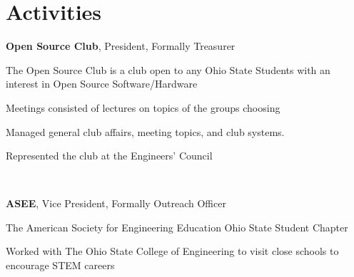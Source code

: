 \documentclass[letterpaper]{resume}
\begin{document}
\section{Activities}

\textbf{Open Source Club}, President, Formally Treasurer
\begin{compactitem}
	\item The Open Source Club is a club open to any Ohio State Students with an interest in Open Source Software/Hardware
	\item Meetings consisted of lectures on topics of the groups choosing
	\item Managed general club affairs, meeting topics, and club systems.
	\item Represented the club at the Engineers' Council
\end{compactitem}

~

\textbf{ASEE}, Vice President, Formally Outreach Officer
\begin{compactitem}
	\item The American Society for Engineering Education Ohio State Student Chapter
	\item Worked with The Ohio State College of Engineering to visit close schools to encourage STEM careers
\end{compactitem}
\end{document}
